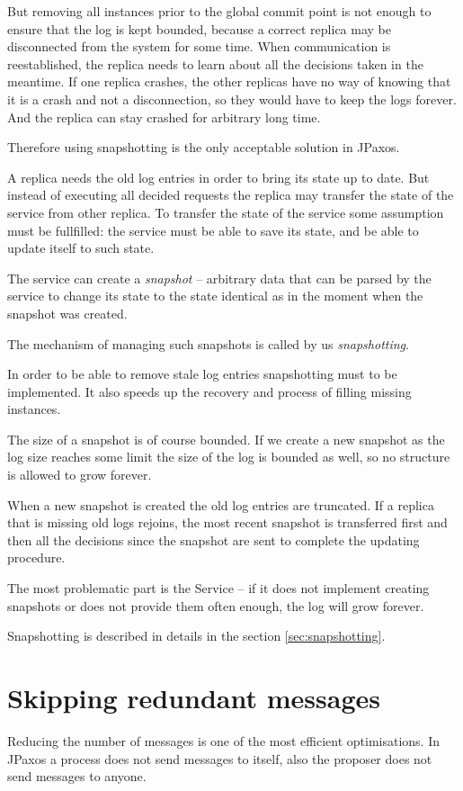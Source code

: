 But removing all instances prior to the global commit point is not enough to ensure that the log is kept bounded, because a correct replica may be disconnected from the system for some time. When communication is reestablished, the replica needs to learn about all the decisions taken in the meantime. If one replica crashes, the other replicas have no way of knowing that it is a crash and not a disconnection, so they would have to keep the logs forever. And the replica can stay crashed for arbitrary long time.

Therefore using snapshotting is the only acceptable solution in JPaxos.


A replica needs the old log entries in order to bring its state up to date. But instead of executing all decided requests the replica may transfer the state of the service from other replica. To transfer the state of the service some assumption must be fullfilled: the service must be able to save its state, and be able to update itself to such state.

The service can create a \textit{snapshot} -- arbitrary data that can be parsed by the service to change its state to the state identical as in the moment when the snapshot was created.

The mechanism of managing such snapshots is called by us \textit{snapshotting}.

In order to be able to remove stale log entries snapshotting must to be implemented. It also speeds up the recovery and process of filling missing instances.

The size of a snapshot is of course bounded. If we create a new snapshot as the log size reaches some limit the size of the log is bounded as well, so no structure is allowed to grow forever.

When a new snapshot is created the old log entries are truncated. If a replica that is missing old logs rejoins, the most recent snapshot is transferred first and then all the decisions since the snapshot are sent to complete the updating procedure.

The most problematic part is the Service -- if it does not implement creating snapshots or does not provide them often enough, the log will grow forever.

Snapshotting is described in details in the section \ref{sec:snapshotting}.

\section{Skipping redundant messages}
Reducing the number of messages is one of the most efficient optimisations. In JPaxos a process does not send messages to itself, also the proposer does not send \accept messages to anyone.

